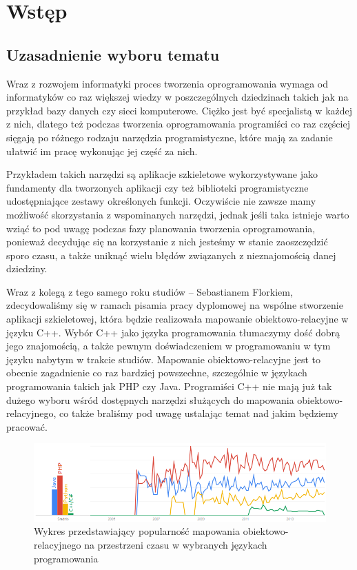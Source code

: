 \documentclass[12pt]{report}
\begin{document}


\tableofcontents

\chapter{Wstęp}
\label{wstep}

\section{Uzasadnienie wyboru tematu}

Wraz z rozwojem informatyki proces tworzenia oprogramowania wymaga od informatyków co raz większej wiedzy w poszczególnych dziedzinach takich jak na przykład bazy 
danych czy sieci komputerowe. Ciężko jest być specjalistą w każdej z nich, dlatego też podczas tworzenia oprogramowania programiści co raz częściej sięgają po różnego 
rodzaju narzędzia programistyczne, które mają za zadanie ułatwić im pracę wykonując jej część za nich.

Przykładem takich narzędzi są aplikacje szkieletowe wykorzystywane jako fundamenty dla tworzonych aplikacji czy też biblioteki programistyczne udostępniające zestawy 
określonych funkcji. Oczywiście nie zawsze mamy możliwość skorzystania z wspominanych narzędzi, jednak jeśli taka istnieje warto wziąć to pod uwagę podczas fazy planowania 
tworzenia  oprogramowania, ponieważ decydując się na korzystanie z nich jesteśmy w stanie zaoszczędzić sporo czasu, a także uniknąć wielu błędów związanych z nieznajomością 
danej dziedziny.

Wraz z kolegą z tego samego roku studiów -- Sebastianem Florkiem, zdecydowaliśmy się w ramach pisamia pracy dyplomowej na wspólne stworzenie aplikacji szkieletowej, 
która będzie realizowała mapowanie obiektowo-relacyjne w języku C++. Wybór C++ jako języka programowania tłumaczymy dość dobrą jego znajomością, a także pewnym
doświadczeniem w programowaniu w tym języku nabytym w trakcie studiów. Mapowanie obiektowo-relacyjne jest to obecnie zagadnienie co raz bardziej powszechne, szczególnie w 
językach programowania takich jak PHP czy Java. Programiści C++ nie mają już tak dużego wyboru wśród dostępnych narzędzi służących do mapowania 
obiektowo-relacyjnego, co także braliśmy pod uwagę ustalając temat nad jakim będziemy pracować.

\begin{figure}[H]
\centering
\includegraphics[width=\textwidth]{resources/trends.png}
\caption[Wykres przedstawiający popularność mapowania obiektowo-relacyjnego na przestrzeni czasu w wybranych językach programowania] {Wykres przedstawiający 
popularność mapowania obiektowo-relacyjnego na przestrzeni czasu w wybranych językach programowania \cite{trends}}
\end{figure}
\end{document}
